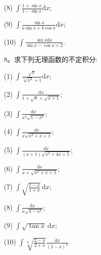 (8) $\displaystyle \int\frac{1+\sin x}{1-\sin x}\mathrm dx$;

(9) $\displaystyle \int\frac{\sin x}{a\sin x+b\cos x}\mathrm dx$;

(10) $\displaystyle \int\frac{\sin x\mathrm dx}{\sin x-\cos x+2}$.

8。求下列无理函数的不定积分:

(1) $\displaystyle \int\frac{\sqrt x}{\sqrt[4]{x^3}+1}\mathrm dx$;

(2) $\displaystyle \int\frac{\mathrm dx}{1+\sqrt x+\sqrt{x+1}}$;

(3) $\displaystyle \int\frac{\mathrm dx}{x^4\sqrt{1-x^2}}$;

(4) $\displaystyle \int\frac{\mathrm dx}{x\sqrt{x^2+x+1}}$;

(5) $\displaystyle \int\frac{\mathrm dx}{(x+1)\sqrt{x^2+4x+5}}$;

(6) $\displaystyle \int\frac{\mathrm dx}{x+\sqrt{x^2+x+1}}$;

(7) $\displaystyle \int\sqrt{\frac{1-x}{1+x}}\,\mathrm dx$;

(8) $\displaystyle \int\frac{\mathrm dx}{x\sqrt{4-x^2}}$;

(9) $\displaystyle \int\sqrt{\tan x}\,\mathrm dx$;

(10) $\displaystyle \int\sqrt[3]{\frac{2-x}{2+x}}\frac{\mathrm dx}{(2-x)^2}$.

